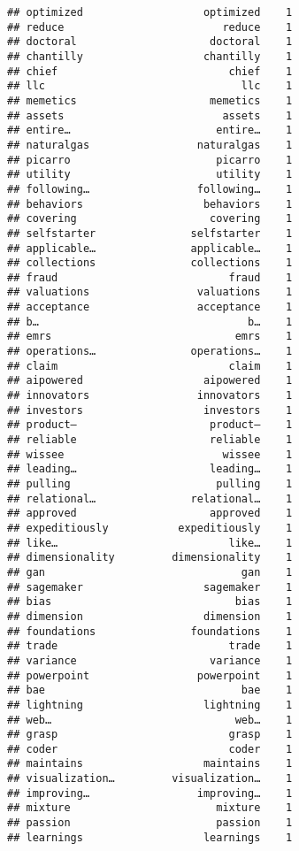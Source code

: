 \documentclass[]{article}
\begin{document}
\begin{verbatim}
## optimized                   optimized    1
## reduce                         reduce    1
## doctoral                     doctoral    1
## chantilly                   chantilly    1
## chief                           chief    1
## llc                               llc    1
## memetics                     memetics    1
## assets                         assets    1
## entire…                       entire…    1
## naturalgas                 naturalgas    1
## picarro                       picarro    1
## utility                       utility    1
## following…                 following…    1
## behaviors                   behaviors    1
## covering                     covering    1
## selfstarter               selfstarter    1
## applicable…               applicable…    1
## collections               collections    1
## fraud                           fraud    1
## valuations                 valuations    1
## acceptance                 acceptance    1
## b…                                 b…    1
## emrs                             emrs    1
## operations…               operations…    1
## claim                           claim    1
## aipowered                   aipowered    1
## innovators                 innovators    1
## investors                   investors    1
## product—                     product—    1
## reliable                     reliable    1
## wissee                         wissee    1
## leading…                     leading…    1
## pulling                       pulling    1
## relational…               relational…    1
## approved                     approved    1
## expeditiously           expeditiously    1
## like…                           like…    1
## dimensionality         dimensionality    1
## gan                               gan    1
## sagemaker                   sagemaker    1
## bias                             bias    1
## dimension                   dimension    1
## foundations               foundations    1
## trade                           trade    1
## variance                     variance    1
## powerpoint                 powerpoint    1
## bae                               bae    1
## lightning                   lightning    1
## web…                             web…    1
## grasp                           grasp    1
## coder                           coder    1
## maintains                   maintains    1
## visualization…         visualization…    1
## improving…                 improving…    1
## mixture                       mixture    1
## passion                       passion    1
## learnings                   learnings    1

\end{verbatim}
\end{document}

